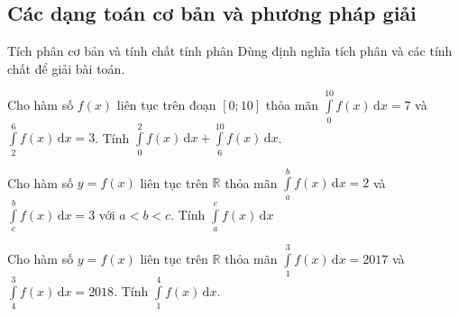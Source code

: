\subsection{Các dạng toán cơ bản và phương pháp giải}
\begin{dang}{Tích phân cơ bản và tính chất tính phân}
	Dùng định nghĩa tích phân và các tính chất để giải bài toán. 
\end{dang}
\begin{bt}%
	\begin{enumEX}{1}
		\item Cho hàm số $ f(x) $ liên tục trên đoạn $ [0;10] $ thỏa mãn $ \displaystyle\int\limits_0^{10} f(x)\mathrm{\,d}x=7 $ và $ \displaystyle\int\limits_2^6 f(x)\mathrm{\,d}x =3$. Tính $ \displaystyle\int\limits_0^2 f(x)\mathrm{\,d}x +\displaystyle\int\limits_6^{10} f(x)\mathrm{\,d}x$.
		\item Cho hàm số $ y=f(x) $ liên tục trên $ \mathbb{R} $ thỏa mãn $ \displaystyle\int\limits_a^b f(x)\mathrm{\,d}x =2$ và $ \displaystyle\int\limits_c^b f(x)\mathrm{\,d}x =3$ với $ a<b<c $. Tính $ \displaystyle\int\limits_a^c f(x)\mathrm{\,d}x $
		\item Cho hàm số $ y=f(x) $ liên tục trên $ \mathbb{R} $ thỏa mãn $ \displaystyle\int\limits_1^3 f(x)\mathrm{\,d}x =2017$ và $ \displaystyle\int\limits_4^3 f(x)\mathrm{\,d}x =2018$. Tính $ \displaystyle\int\limits_1^4 f(x)\mathrm{\,d}x $.
	\end{enumEX}
\end{bt}
